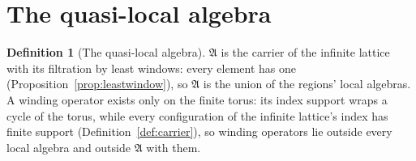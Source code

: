 \documentclass[11pt]{article}
\theoremstyle{definition}
\newtheorem{definition}{Definition}
\begin{document}
\section{The quasi-local algebra}

\begin{definition}[The quasi-local algebra]\label{def:qla}
$\mathfrak A$ is the carrier of the infinite lattice with its filtration
by least windows: every element has one
(Proposition~\ref{prop:leastwindow}), so $\mathfrak A$ is the union of
the regions' local algebras. A winding operator exists only on the finite
torus: its index support wraps a cycle of the torus, while every
configuration of the infinite lattice's index has finite support
(Definition~\ref{def:carrier}), so winding operators lie outside every local algebra and outside
$\mathfrak A$ with them.
\end{definition}
\end{document}
